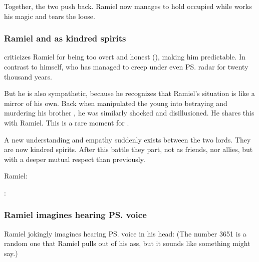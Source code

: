 \begin{garbage}
Together, the two \satharioth{} push \Daggerrain{} back. 
Ramiel now manages to hold \Daggerrain{} occupied while \Azraid{} works his magic and tears the  loose. 





\subsubsection{Ramiel and \Azraid{} as kindred spirits}
\Azraid{} criticizes Ramiel for being too overt and honest (), making him predictable. 
In contrast to \Azraid{} himself, who has managed to creep under even \ps{\Daggerrain}{} radar for twenty thousand years. 

But he is also sympathetic, because he recognizes that Ramiel's situation is like a mirror of his own. 
Back when \Daggerrain{} manipulated the young \Azraid{} into betraying and murdering his brother \Damiarch, he was similarly shocked and disillusioned. 
He shares this with Ramiel. 
This is a rare  moment for \Azraid. 

A new understanding and empathy suddenly exists between the two \resphan{} lords. 
They are now kindred spirits. 
After this battle they part, not as friends, nor allies, but with a deeper mutual respect than previously. 

\begin{prose}
  Ramiel: 

  \Azraid: 
\end{prose}






\subsubsection{Ramiel imagines hearing \ps{\Daggerrain}{} voice}
Ramiel jokingly imagines hearing \ps{\Daggerrain}{} voice in his head: 
(The number 3651 is a random one that Ramiel pulls out of his ass, but it sounds like something \Daggerrain{} might say.)









\end{garbage}
